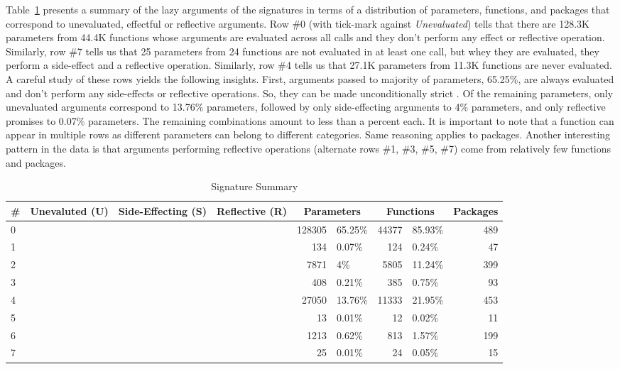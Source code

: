 \documentclass[review,nonacm,screen,acmsmall,anonymous=true]{acmart}
\newcommand{\xmark}{\textcolor{red}{\ding{55}}}
\newcommand{\cmark}{\textcolor{green}{\ding{51}}}
\begin{document}
Table~\ref{table:strictdist} presents a summary of the lazy arguments of the
signatures in terms of a distribution of parameters, functions, and packages
that correspond to unevaluated, effectful or reflective arguments. Row \#0 (with
tick-mark against \emph{Unevaluated}) tells that there are 128.3K parameters
from 44.4K functions whose arguments are evaluated across all calls and they
don't perform any effect or reflective operation. Similarly, row \#7 tells us
that 25 parameters from 24 functions are not evaluated in at least one call, but
whey they are evaluated, they perform a side-effect and a reflective operation.
Similarly, row \#4 tells us that 27.1K parameters from 11.3K functions are never
evaluated. A careful study of these rows yields the following insights. First,
arguments passed to majority of parameters, 65.25\%, are always evaluated and
don't perform any side-effects or reflective operations. So, they can be made
unconditionally strict . Of the remaining parameters, only unevaluated arguments
correspond to 13.76\% parameters, followed by only side-effecting arguments to
4\% parameters, and only reflective promises to 0.07\% parameters. The remaining
combinations amount to less than a percent each. It is important to note that a
function can appear in multiple rows as different parameters can belong to
different categories. Same reasoning applies to packages. Another interesting
pattern in the data is that arguments performing reflective operations
(alternate rows \#1, \#3, \#5, \#7) come from relatively few functions and
packages.
%
\begin{table}
  \vspace{-3mm}
  \small
  \caption{Signature Summary} \label{table:strictdist}
  \centering
  \begin{tabular}{lcccr|lr|lr}
    \toprule
    \#&\bf Unevaluted (U) & \bf Side-Effecting (S) & \bf Reflective (R) & \multicolumn{2}{c}{\textbf{Parameters}} & \multicolumn{2}{c}{\textbf{Functions}}& \bf Packages\\
    \midrule
    0&\xmark{}&\xmark{}&\xmark{}&128305&65.25\%&44377&85.93\%&489\\
    1&\xmark{}&\xmark{}&\cmark{}&134&0.07\%&124&0.24\%&47\\
    2&\xmark{}&\cmark{}&\xmark{}&7871&4\%&5805&11.24\%&399\\
    3&\xmark{}&\cmark{}&\cmark{}&408&0.21\%&385&0.75\%&93\\
    4&\cmark{}&\xmark{}&\xmark{}&27050&13.76\%&11333&21.95\%&453\\
    5&\cmark{}&\xmark{}&\cmark{}&13&0.01\%&12&0.02\%&11\\
    6&\cmark{}&\cmark{}&\xmark{}&1213&0.62\%&813&1.57\%&199\\
    7&\cmark{}&\cmark{}&\cmark{}&25&0.01\%&24&0.05\%&15\\
    \bottomrule
  \end{tabular}
\end{table}
\end{document}
